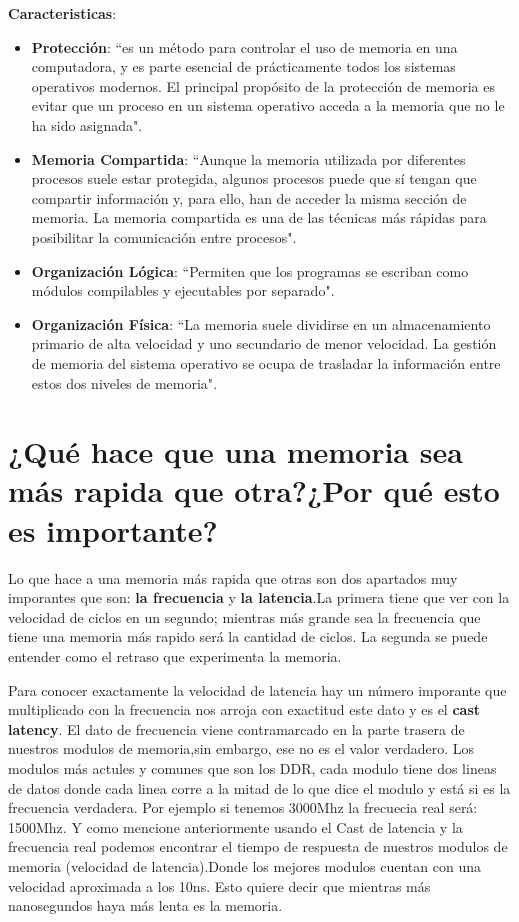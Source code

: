 \documentclass{article}
\begin{document}
\textbf{Caracteristicas}:

\begin{itemize}
\item\textbf{Protección}:  ``es un método para controlar el uso de memoria en una computadora, y es parte esencial de prácticamente todos los sistemas operativos modernos. El principal propósito de la protección de memoria es evitar que un proceso en un sistema operativo acceda a la memoria que no le ha sido asignada"\cite[Unidad 3. Procesos de memoria y almacenamiento]{Sites.Google}.
\item\textbf{Memoria Compartida}:  ``Aunque la memoria utilizada por diferentes procesos suele estar protegida, algunos procesos puede que sí tengan que compartir información y, para ello, han de acceder la misma sección de memoria. La memoria compartida es una de las técnicas más rápidas para posibilitar la comunicación entre procesos"\cite[Unidad 3. Procesos de memoria y almacenamiento]{Sites.Google}.
\item\textbf{Organización Lógica}:  ``Permiten que los programas se escriban como módulos compilables y ejecutables por separado"\cite[Unidad 3. Procesos de memoria y almacenamiento]{Sites.Google}.
\item\textbf{Organización Física}:  ``La memoria suele dividirse en un almacenamiento primario de alta velocidad y uno secundario de menor velocidad.  La gestión de memoria del sistema operativo se ocupa de trasladar la información entre estos dos niveles de memoria"\cite[Unidad 3. Procesos de memoria y almacenamiento]{Sites.Google}.
\end{itemize}
\newpage
\section{¿Qué hace que una memoria sea más rapida que otra?¿Por qué esto es importante?}
 Lo que hace a una memoria más rapida que otras son dos apartados muy imporantes que son: \textbf{la frecuencia} y \textbf{la latencia}.La primera tiene que ver con la velocidad de ciclos en un segundo; mientras más grande sea la frecuencia que tiene una memoria más rapido será la cantidad de ciclos. La segunda se puede entender como el retraso que experimenta la memoria.
\vspace{0.2cm}

Para conocer exactamente la velocidad de latencia hay un número imporante que multiplicado con la frecuencia nos  arroja con exactitud este dato y es el \textbf{cast latency}. El dato de frecuencia viene contramarcado en la parte trasera de nuestros modulos de memoria,sin embargo, ese no es el valor verdadero. Los modulos más actules y comunes que son los DDR, cada modulo tiene dos lineas de datos donde cada linea corre a la mitad de lo que dice el modulo y está si es la frecuencia verdadera. Por ejemplo si tenemos 3000Mhz la frecuecia real será: 1500Mhz. Y como mencione anteriormente usando el Cast de latencia y la frecuencia real podemos encontrar el tiempo de respuesta de nuestros modulos de memoria (velocidad de latencia).Donde los mejores modulos cuentan con una velocidad aproximada  a los 10ns. Esto quiere decir que mientras más nanosegundos haya más lenta es la memoria.
\vspace{0.2cm}
\end{document}
